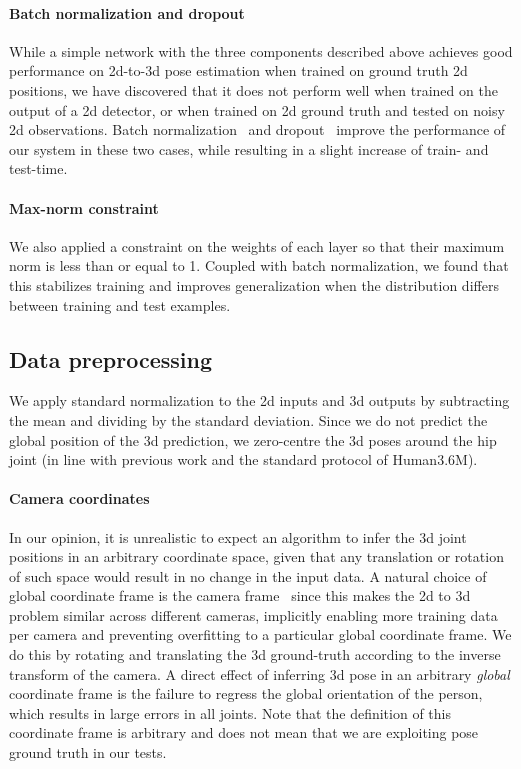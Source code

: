 \documentclass[10pt,twocolumn,letterpaper]{article}
\begin{document}
\paragraph{Batch normalization and dropout}
While a simple network with the three components described above achieves good performance on 2d-to-3d pose estimation when trained on ground truth 2d positions, we have discovered that it does not perform well when trained on the output of a 2d detector, or when trained on 2d ground truth and tested on noisy 2d observations. Batch normalization~\cite{batch-norm} and dropout~\cite{dropout} improve the performance of our system in these two cases, while resulting in a slight increase of train- and test-time.

\paragraph{Max-norm constraint}
We also applied a constraint on the weights of each layer so that their maximum norm is less than or equal to 1.
Coupled with batch normalization, we found that this stabilizes training and improves generalization when the distribution differs between training and test examples.

\subsection{Data preprocessing}

We apply standard normalization to the 2d inputs and 3d outputs by subtracting the mean and dividing by the standard deviation. 
Since we do not predict the global position of the 3d prediction, we zero-centre the 3d poses around the hip joint (in line with previous work and the standard protocol of Human3.6M).

\paragraph{Camera coordinates}
In our opinion, it is unrealistic to expect an algorithm to infer the 3d joint positions in an arbitrary coordinate space, given that any translation or rotation of such space would result in no change in the input data.
A natural choice of global coordinate frame is the camera frame~\cite{tekin2016direct,zhou2016sparseness,li2015maximum,volumetric,du2016marker,zhou2016deep} since this makes the 2d to 3d problem similar across different cameras, implicitly enabling more training data per camera and preventing overfitting to a particular global coordinate frame.
We do this by rotating and translating the 3d ground-truth according to the inverse transform of the camera.
A direct effect of inferring 3d pose in an arbitrary \emph{global} coordinate frame is the failure to regress the global orientation of the person, which results in large errors in all joints. Note that the definition of this coordinate frame is arbitrary and does not mean that we are exploiting pose ground truth in our tests.
\end{document}

